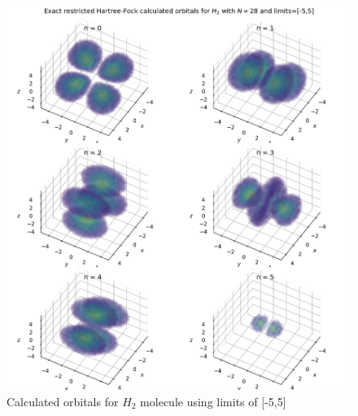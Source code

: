 \documentclass[10pt, oneside, letterpaper]{article}
\begin{document}
\begin{figure}[H]
  \begin{center}
    \includegraphics[scale=0.75]{h2_N28_l5.png}
  \end{center}
  \caption{Calculated orbitals for $H_2$ molecule using limits of [-5,5]}
  \label{h2-plot-l5}
\end{figure}
\end{document}
